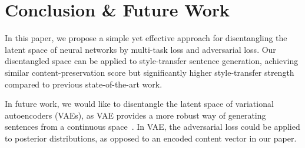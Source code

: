 \documentclass[11pt,a4paper]{article}
\begin{document}
\begin{table}[!t]
	\centering
	\caption{Examples of style-transfer generation.}
	\label{tab:transfer-samples}
	\vspace{-.3cm}
\end{table}

\section{Conclusion \& Future Work}
In this paper, we propose a simple yet effective approach for disentangling the latent space of neural networks by multi-task loss and adversarial loss. Our disentangled space can be applied to style-transfer sentence generation, achieving similar content-preservation score but significantly higher style-transfer strength compared to previous state-of-the-art work.

In future work, we would like to disentangle the latent space of variational autoencoders (VAEs), as VAE provides a more robust way of generating sentences from a continuous space~\cite{bowman2016generating}. In VAE, the adversarial loss could be applied to posterior distributions, as opposed to an encoded content vector in our paper.



\end{document}

